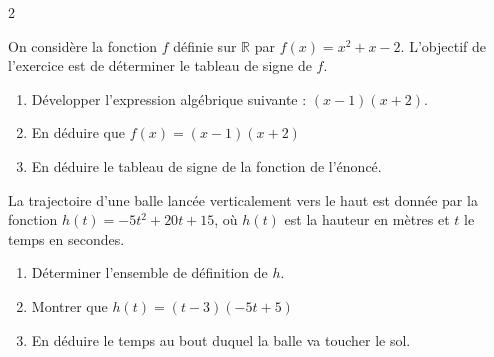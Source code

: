\documentclass[10pt,a4paper]{article}
\begin{document}
\begin{multicols}{2}
\begin{exo}[][appro]
On considère la fonction \(f\) définie sur \(\mathbb{R}\) par \(f(x)=x^2+x-2\). L'objectif de l'exercice est de déterminer le tableau de signe de \(f\).

\begin{enumerate}[leftmargin=*]
    \item Développer l'expression  algébrique suivante : \((x-1)(x+2)\).
    \item En déduire que \(f(x)=(x-1)(x+2)\)
    \item En déduire le tableau de signe de la fonction de l'énoncé.
\end{enumerate}
\end{exo}


\begin{exo}[][appro]
    La trajectoire d'une balle lancée verticalement vers le haut est donnée par la fonction \(h(t)=-5t^2+20t+15\), où \(h(t)\) est la hauteur en mètres et \(t\) le temps en secondes.
        \begin{enumerate}
            \item Déterminer l'ensemble de définition de \(h\).
            \item Montrer que \(h(t)=(t-3)(-5t+5)\)
            \item En déduire le temps au bout duquel la balle va toucher le sol.
        \end{enumerate}
\end{exo}




\end{multicols}
\end{document}
